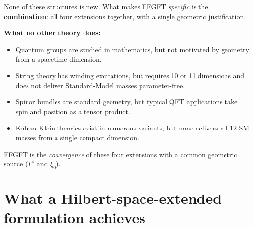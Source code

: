 \begin{center}
\renewcommand{\arraystretch}{1.4}
{\small
{}
}
\renewcommand{\arraystretch}{1.0}
\end{center}

None of these structures is new. What makes FFGFT \emph{specific} is
the \textbf{combination}: all four extensions together, with a
single geometric justification.

\textbf{What no other theory does:}
\begin{itemize}[leftmargin=2em,itemsep=2pt,topsep=2pt]
  \item Quantum groups are studied in mathematics, but not motivated
        by geometry from a spacetime dimension.
  \item String theory has winding excitations, but requires 10 or
        11 dimensions and does not deliver Standard-Model masses
        parameter-free.
  \item Spinor bundles are standard geometry, but typical QFT
        applications take spin and position as a tensor product.
  \item Kaluza-Klein theories exist in numerous variants, but none
        delivers all 12 SM masses from a single compact dimension.
\end{itemize}

FFGFT is the \emph{convergence} of these four extensions with a
common geometric source ($T^4$ and $\xi_0$).

\section{What a Hilbert-space-extended formulation achieves}

